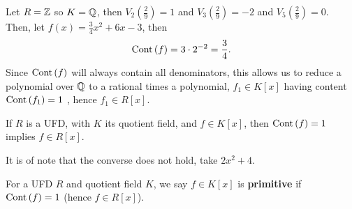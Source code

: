 \begin{example}
	Let \(R = \mathbb{Z}\) so \(K = \mathbb{Q}\), then \(V_{2}\left( \frac{2}{9} \right)  = 1\) and \(V_{3}\left( \frac{2}{9} \right) = -2 \) and \(V_{5}\left( \frac{2}{9} \right) = 0 \).\\
	Then, let \(f\left( x \right)  = \frac{3}{4}x^2 + 6x -3\), then \[
	\operatorname{Cont} \left( f \right) = 3 \cdot 2^{-2} = \frac{3}{4}
	.\]
	Since \(\operatorname{Cont}\left( f \right) \) will always contain all denominators, this allows us to reduce a polynomial over \(\mathbb{Q}\) to a rational times a polynomial, \(f_1 \in K\left[ x \right] \) having content \(\operatorname{Cont}\left( f_1 \right) = 1\) , hence \(f_1 \in R\left[ x \right] \).
\end{example}
\begin{lemma}
	If \(R\) is a UFD, with \(K\) its quotient field, and \(f \in K\left[ x \right] \), then \(\operatorname{Cont}\left( f \right)  = 1\) implies \(f \in R\left[ x \right] \).
\end{lemma}
\begin{remark}
	It is of note that the converse does not hold, take \(2x^2 + 4\).
\end{remark}
\begin{definition}
	For a UFD \(R\) and quotient field \(K\), we say \(f \in K\left[ x \right] \) is \textbf{primitive} if \(\operatorname{Cont} \left( f \right)  = 1\) (hence \(f \in R\left[ x \right] \)).
\end{definition}
